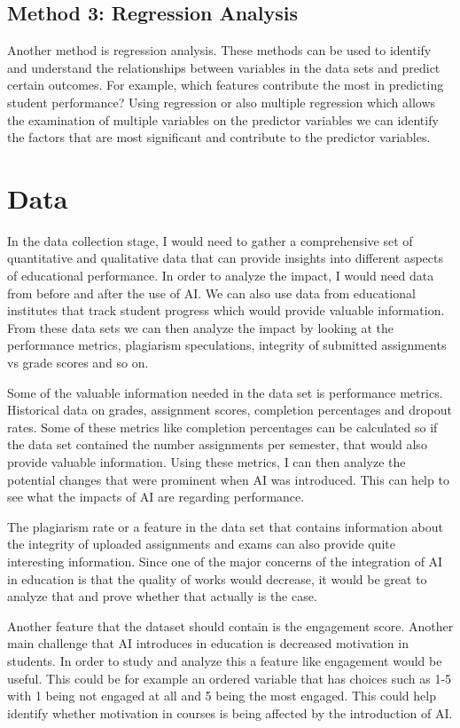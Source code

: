 \documentclass{imc-inf}
\begin{document}
\subsection{Method 3: Regression Analysis}
Another method is regression analysis. These methods can be used to identify and understand the relationships between variables in the data sets and predict certain outcomes. For example, which features contribute the most in predicting student performance? Using regression or also multiple regression which allows the examination of multiple variables on the predictor variables we can identify the factors that are most significant and contribute to the predictor variables. 

\section{Data}
In the data collection stage, I would need to gather a comprehensive set of quantitative and qualitative data that can provide insights into different aspects of educational performance. In order to analyze the impact, I would need data from before and after the use of AI. We can also use data from educational institutes that track student progress which would provide valuable information. From these data sets we can then analyze the impact by looking at the performance metrics, plagiarism speculations, integrity of submitted assignments vs grade scores and so on. 

Some of the valuable information needed in the data set is performance metrics. Historical data on grades, assignment scores, completion percentages and dropout rates. Some of these metrics like completion percentages can be calculated so if the data set contained the number assignments per semester, that would also provide valuable information. Using these metrics, I can then analyze the potential changes that were prominent when AI was introduced. This can help to see what the impacts of AI are regarding performance. 

The plagiarism rate or a feature in the data set that contains information about the integrity of uploaded assignments and exams can also provide quite interesting information. Since one of the major concerns of the integration of AI in education is that the quality of works would decrease, it would be great to analyze that and prove whether that actually is the case. 

Another feature that the dataset should contain is the engagement score. Another main challenge that AI introduces in education is decreased motivation in students. In order to study and analyze this a feature like engagement would be useful. This could be for example an ordered variable that has choices such as 1-5 with 1 being not engaged at all and 5 being the most engaged. This could help identify whether motivation in courses is being affected by the introduction of AI. 
\end{document}
